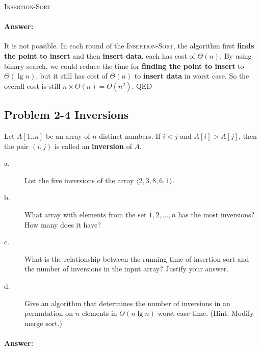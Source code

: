 \documentclass{article}
\newcommand{\problem}[1]{\subsection*{Problem #1}}
\newcommand{\answer}{\paragraph{Answer:}}
\newcommand{\qed}{ QED}
\begin{document}
\begin{algorithm}[H]
\caption{\textsc{Insertion-Sort}}
\end{algorithm}


\answer

It is not possible. In each round of the \textsc{Insertion-Sort}, the algorithm first \textbf{finds the point to insert} and then \textbf{insert data},
each has cost of $\Theta(n)$. By using binary search, we could reduce the time for \textbf{finding the point to insert} to $\Theta(\lg n)$,
but it still has cost of $\Theta(n)$  to \textbf{insert data} in worst case. So the overall cost is still $n\times \Theta(n) = \Theta(n^2)$.
\qed

\problem{2-4 Inversions}

Let $A[1..n]$ be an array of $n$ distinct numbers. If $i<j$ and $A[i]>A[j]$, then the pair $(i,j)$ is called an \textbf{inversion} of $A$.

\begin{description}
\item[a. \hspace{9pt}] List the five inversions of the array $\langle2, 3, 8, 6, 1\rangle$.

\item[b. \hspace{9pt}] What array with elements from the set ${1, 2, ..., n}$ has the most inversions? How many does it have?

\item[c. \hspace{9pt}] What is the relationship between the running time of insertion sort and the number of inversions in the input array? Justify your answer.

\item[d. \hspace{9pt}] Give an algorithm that determines the number of inversions in an permutation on $n$ elements in $\Theta(n\lg n)$ worst-case time. (Hint: Modify merge sort.)
\end{description}

\answer
\end{document}
